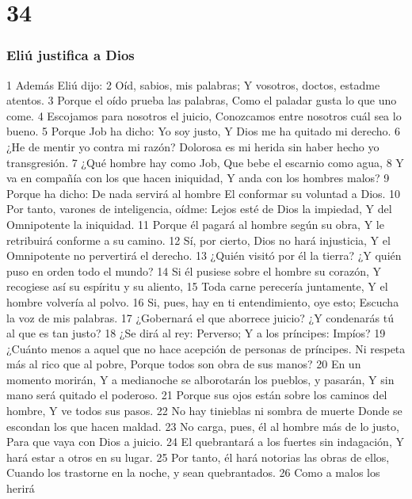 \chapter{34}

\subsection*{Eliú justifica a Dios}  

1 Además Eliú dijo:  
2 Oíd, sabios, mis palabras;  
Y vosotros, doctos, estadme atentos.  
3 Porque el oído prueba las palabras,  
Como el paladar gusta lo que uno come.  
4 Escojamos para nosotros el juicio,  
Conozcamos entre nosotros cuál sea lo bueno.  
5 Porque Job ha dicho: Yo soy justo,  
Y Dios me ha quitado mi derecho.  
6 ¿He de mentir yo contra mi razón?  
Dolorosa es mi herida sin haber hecho yo transgresión.  
7 ¿Qué hombre hay como Job,  
Que bebe el escarnio como agua,  
8 Y va en compañía con los que hacen iniquidad,  
Y anda con los hombres malos?  
9 Porque ha dicho: De nada servirá al hombre  
El conformar su voluntad a Dios.  
10 Por tanto, varones de inteligencia, oídme:  
Lejos esté de Dios la impiedad,  
Y del Omnipotente la iniquidad.  
11 Porque él pagará al hombre según su obra,  
Y le retribuirá conforme a su camino. 
12 Sí, por cierto, Dios no hará injusticia,  
Y el Omnipotente no pervertirá el derecho.  
13 ¿Quién visitó por él la tierra?  
¿Y quién puso en orden todo el mundo?  
14 Si él pusiese sobre el hombre su corazón,  
Y recogiese así su espíritu y su aliento,  
15 Toda carne perecería juntamente,  
Y el hombre volvería al polvo.  
16 Si, pues, hay en ti entendimiento, oye esto;  
Escucha la voz de mis palabras.  
17 ¿Gobernará el que aborrece juicio?  
¿Y condenarás tú al que es tan justo?  
18 ¿Se dirá al rey: Perverso;  
Y a los príncipes: Impíos?  
19 ¿Cuánto menos a aquel que no hace acepción de personas de príncipes.  
Ni respeta más al rico que al pobre,  
Porque todos son obra de sus manos?  
20 En un momento morirán,  
Y a medianoche se alborotarán los pueblos, y pasarán,  
Y sin mano será quitado el poderoso.  
21 Porque sus ojos están sobre los caminos del hombre,  
Y ve todos sus pasos.  
22 No hay tinieblas ni sombra de muerte  
Donde se escondan los que hacen maldad.  
23 No carga, pues, él al hombre más de lo justo,  
Para que vaya con Dios a juicio. 
24 El quebrantará a los fuertes sin indagación,  
Y hará estar a otros en su lugar.  
25 Por tanto, él hará notorias las obras de ellos,  
Cuando los trastorne en la noche, y sean quebrantados.  
26 Como a malos los herirá  
